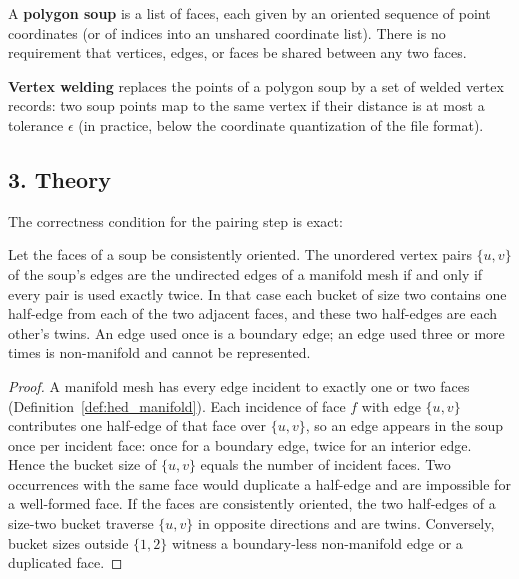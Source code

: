 \begin{definition}\label{def:hed_polygon_soup}
A \textbf{polygon soup} is a list of faces, each given by an oriented
sequence of point coordinates (or of indices into an unshared coordinate
list). There is no requirement that vertices, edges, or faces be shared
between any two faces.
\end{definition}

\begin{definition}\label{def:hed_welding}
\textbf{Vertex welding} replaces the points of a polygon soup by a set of
welded vertex records: two soup points map to the same
vertex if their distance is at most a tolerance $\epsilon$ (in practice,
below the coordinate quantization of the file format).
\end{definition}

\subsection{3. Theory}

The correctness condition for the pairing step is exact:

\begin{theorem}\label{thm:hed_pairing}
Let the faces of a soup be consistently oriented. The unordered vertex
pairs $\{u,v\}$ of the soup's edges are the undirected edges of a manifold
mesh if and only if every pair is used exactly twice. In that case each
bucket of size two contains one half-edge from each of the two adjacent
faces, and these two half-edges are each other's twins. An edge used once
is a boundary edge; an edge used three or more times is non-manifold and
cannot be represented.
\end{theorem}

\begin{proof}
A manifold mesh has every edge incident to exactly one or two faces
(Definition~\ref{def:hed_manifold}). Each incidence of face $f$ with edge
$\{u,v\}$ contributes one half-edge of that face over $\{u,v\}$, so an edge
appears in the soup once per incident face: once for a boundary edge, twice
for an interior edge. Hence the bucket size of $\{u,v\}$ equals the number
of incident faces. Two occurrences with the same face would duplicate a
half-edge and are impossible for a well-formed face. If the faces are
consistently oriented, the two half-edges of a size-two bucket traverse
$\{u,v\}$ in opposite directions and are twins. Conversely, bucket sizes
outside $\{1,2\}$ witness a boundary-less non-manifold edge or a duplicated
face.
\end{proof}

